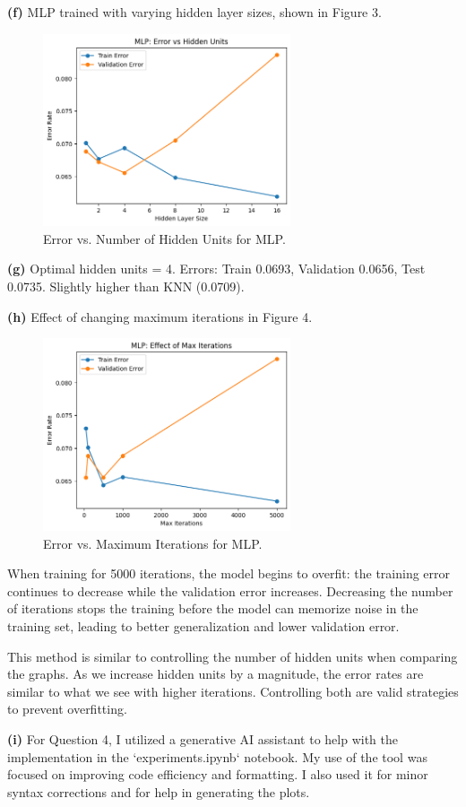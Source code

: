 \documentclass[11pt]{article}
\begin{document}
\noindent\textbf{(f)} MLP trained with varying hidden layer sizes, shown in Figure 3.
\begin{figure}[H]
\centering
\includegraphics[width=0.65\textwidth]{mlp.png}
\caption{Error vs. Number of Hidden Units for MLP.}
\end{figure}

\noindent\textbf{(g)} Optimal hidden units = 4. Errors: Train 0.0693, Validation 0.0656, Test 0.0735. Slightly higher than KNN (0.0709).  

\noindent\textbf{(h)} Effect of changing maximum iterations in Figure 4.
\begin{figure}[H]
\centering
\includegraphics[width=0.65\textwidth]{mlp_max_iter.png}
\caption{Error vs. Maximum Iterations for MLP.}
\end{figure}


When training for 5000 iterations, the model begins to overfit: the training error continues to decrease while the validation error increases. Decreasing the number of iterations stops the training before the model can memorize noise in the training set, leading to better generalization and lower validation error.

This method is similar to controlling the number of hidden units when comparing the graphs. As we increase hidden units by a magnitude, the error rates are similar to what we see with higher iterations. Controlling both are valid strategies to prevent overfitting.



\noindent
\textbf{(i)} For Question 4, I utilized a generative AI assistant to help with the implementation in the `experiments.ipynb` notebook. My use of the tool was focused on improving code efficiency and formatting. I also used it for minor syntax corrections and for help in generating the plots.
\end{document}
